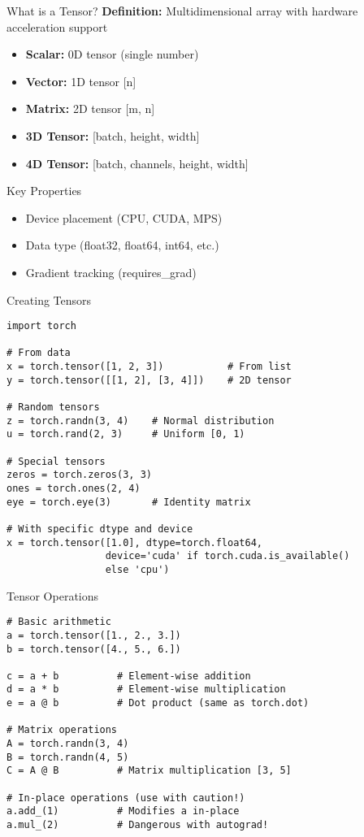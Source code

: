 \documentclass[aspectratio=169,10pt]{beamer}
\begin{document}
\begin{frame}{What is a Tensor?}
\textbf{Definition:} Multidimensional array with hardware acceleration support

\begin{itemize}
    \item \textbf{Scalar:} 0D tensor (single number)
    \item \textbf{Vector:} 1D tensor [n]
    \item \textbf{Matrix:} 2D tensor [m, n]
    \item \textbf{3D Tensor:} [batch, height, width]
    \item \textbf{4D Tensor:} [batch, channels, height, width]
\end{itemize}

\begin{block}{Key Properties}
\begin{itemize}
    \item Device placement (CPU, CUDA, MPS)
    \item Data type (float32, float64, int64, etc.)
    \item Gradient tracking (requires\_grad)
\end{itemize}
\end{block}
\end{frame}

\begin{frame}[fragile]{Creating Tensors}
\begin{lstlisting}
import torch

# From data
x = torch.tensor([1, 2, 3])           # From list
y = torch.tensor([[1, 2], [3, 4]])    # 2D tensor

# Random tensors
z = torch.randn(3, 4)    # Normal distribution
u = torch.rand(2, 3)     # Uniform [0, 1)

# Special tensors
zeros = torch.zeros(3, 3)
ones = torch.ones(2, 4)
eye = torch.eye(3)       # Identity matrix

# With specific dtype and device
x = torch.tensor([1.0], dtype=torch.float64,
                 device='cuda' if torch.cuda.is_available() 
                 else 'cpu')
\end{lstlisting}
\end{frame}

\begin{frame}[fragile]{Tensor Operations}
\begin{lstlisting}
# Basic arithmetic
a = torch.tensor([1., 2., 3.])
b = torch.tensor([4., 5., 6.])

c = a + b          # Element-wise addition
d = a * b          # Element-wise multiplication
e = a @ b          # Dot product (same as torch.dot)

# Matrix operations
A = torch.randn(3, 4)
B = torch.randn(4, 5)
C = A @ B          # Matrix multiplication [3, 5]

# In-place operations (use with caution!)
a.add_(1)          # Modifies a in-place
a.mul_(2)          # Dangerous with autograd!
\end{lstlisting}
\end{frame}
\end{document}
